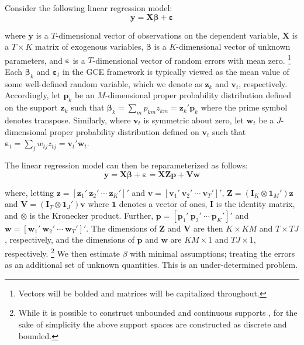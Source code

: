 \documentclass{elsarticle}
\begin{document}
Consider the following linear regression model: 
\begin{equation}
\mathbf{y} = \mathbf{X\beta} + \mathbf{\varepsilon}
\end{equation}

\noindent
where $\mathbf{y}$ is a $T$-dimensional vector of observations on the 
dependent variable, $\mathbf{X}$ is a $T\times K$ matrix of exogenous
variables, $\mathbf{\beta}$ is a $K$-dimensional vector of unknown 
parameters, and $\mathbf{\varepsilon}$ is a $T$-dimensional vector of 
random errors with mean zero.%
\footnote{Vectors will be bolded and matrices will be capitalized throughout.}
Each $\mathbf{\beta}_k$ and $\mathbf{\varepsilon}_t$ in the GCE 
framework is typically viewed as the mean value of some well-defined 
random variable, which we denote as $\mathbf{z}_k$ and $\mathbf{v}_t$, 
respectively.
Accordingly, let $\mathbf{p}_k$ be an $M$-dimensional proper 
probability distribution defined on the support $\mathbf{z}_k$ such that 
$\mathbf{\beta}_k = \sum_m p_{km}z_{km} = \mathbf{z}_k' 
\mathbf{p}_k$ where the prime symbol denotes transpose.
Similarly, where $\mathbf{v}_t$ is symmetric about zero, let $\mathbf{w}_t$ 
be a $J$-dimensional proper probability distribution defined on $\mathbf{v}_t$ 
such that $\mathbf{\varepsilon}_t = \sum_j w_{tj}z_{tj} = \mathbf{v}_t' 
\mathbf{w}_t$.

The linear regression model can then be reparameterized as follows:
\begin{equation}
\mathbf{y} = \mathbf{X\beta} + \mathbf{\varepsilon} = 
\mathbf{X Z p} + \mathbf{V w}
\label{eq: reparm}
\end{equation}

\noindent
where, letting $\mathbf{z}=[\mathbf{z}_1' ~ \mathbf{z}_2' ~ \cdots ~ 
\mathbf{z}_K' ]'$ and $\mathbf{v}=[\mathbf{v}_1' ~ \mathbf{v}_2' ~ 
\cdots ~ \mathbf{v}_T' ]'$, 
$\mathbf{Z}= (\mathbf{I}_K \otimes \mathbf{1}_M')\mathbf{z}$ and
$\mathbf{V}= (\mathbf{I}_T \otimes \mathbf{1}_J')\mathbf{v}$
where $\mathbf{1}$ denotes a vector of ones, $\mathbf{I}$ is the 
identity matrix, and $\otimes$ is the Kronecker product.
Further, $\mathbf{p} = [\mathbf{p}_1' ~ \mathbf{p}_2' ~ \cdots ~ 
\mathbf{p}_K' ]'$ and $\mathbf{w} = [\mathbf{w}_1' ~ \mathbf{w}_2' 
~ \cdots ~ \mathbf{w}_T' ]'$.
The dimensions of $\mathbf{Z}$ and $\mathbf{V}$ are then 
$K \times KM$ and $T \times TJ$, respectively, and the dimensions of 
$\mathbf{p}$ and $\mathbf{w}$ are $KM \times 1$ and $TJ \times 1$, 
respectively.%
\footnote{While it is possible to construct unbounded 
and continuous supports \citep{golan2012}, for the sake of simplicity the above 
support spaces are constructed as discrete and bounded.} 
We then estimate $\beta$ with minimal assumptions; treating the errors as an additional 
set of unknown quantities.
This is an under-determined problem. 
\end{document}

